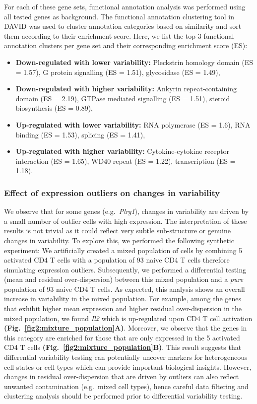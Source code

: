 For each of these gene sets, functional annotation analysis was performed using all tested genes as background. The functional annotation clustering tool in DAVID \citep{Dennis2003} was used to cluster annotation categories based on similarity and sort them according to their enrichment score. Here, we list the top 3 functional annotation clusters per gene set and their corresponding enrichment score (ES):
\begin{itemize}
\item \textbf{Down-regulated with lower variability:} Pleckstrin homology domain (ES = 1.57), G protein signalling (ES = 1.51), glycosidase (ES = 1.49),
\item \textbf{Down-regulated with higher variability:} Ankyrin repeat-containing domain (ES = 2.19), GTPase mediated signalling (ES = 1.51), steroid biosynthesis (ES = 0.89), 
\item \textbf{Up-regulated with lower variability:} RNA polymerase (ES = 1.6), RNA binding (ES = 1.53), splicing (ES = 1.41),
\item \textbf{Up-regulated with higher variability:} Cytokine-cytokine receptor interaction (ES = 1.65), WD40 repeat (ES = 1.22), transcription (ES = 1.18).
\end{itemize}

\subsubsection{Effect of expression outliers on changes in variability}

We observe that for some genes (e.g.~\textit{Plrg1}), changes in variability are driven by a small number of outlier cells with high expression. The interpretation of these results is not trivial as it could reflect very subtle sub-structure or genuine changes in variability. To explore this, we performed the following synthetic experiment: We artificially created a mixed population of cells by combining 5 activated CD4\plus{} T cells with a population of 93 naive CD4\plus{} T cells therefore simulating expression outliers. Subsequently, we performed a differential testing (mean and residual over-dispersion) between this mixed population and a \textit{pure} population of 93 naive CD4\plus{} T cells. As expected, this analysis shows an overall increase in variability in the mixed population. For example, among the genes that exhibit higher mean expression and higher residual over-dispersion in the mixed population, we found \textit{Il2} which is up-regulated upon CD4\plus{} T cell activation \textbf{(Fig.~\ref{fig2:mixture_population}A)}. Moreover, we observe that the genes in this category are enriched for those that are only expressed in the 5 activated CD4\plus{} T cells \textbf{(Fig.~\ref{fig2:mixture_population}B)}. This result suggests that differential variability testing can potentially uncover markers for heterogeneous cell states or cell types which can provide important biological insights. However, changes in residual over-dispersion that are driven by outliers can also reflect unwanted contamination (e.g.~mixed cell types), hence careful data filtering and clustering analysis should be performed prior to differential variability testing. 

